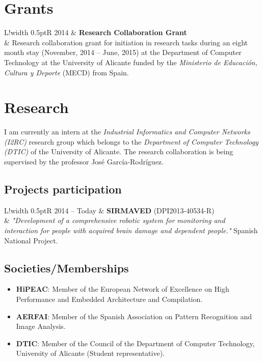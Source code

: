 \documentclass[8pt]{article}
\newcommand\VRule{\color{lightgray}\vrule width 0.5pt}
\begin{document}
\section*{Grants}
\begin{tabular}{L!{\VRule}R}
2014 & \textbf{Research Collaboration Grant}\\
& Research collaboration grant for initiation in research tasks during an eight month stay (November, 2014 -- June, 2015) at the Department of Computer Technology at the University of Alicante funded by the \textit{Ministerio de Educación, Cultura y Deporte} (MECD) from Spain.
\end{tabular}

\section*{Research}

I am currently an intern at the \textit{Industrial Informatics and Computer Networks (I2RC)} research group which belongs to the \textit{Department of Computer Technology (DTIC)} of the University of Alicante. The research collaboration is being supervised by the professor José García-Rodríguez.

\subsection*{Projects participation}

\begin{tabular}{L!{\VRule}R}
	2014 -- Today & \textbf{SIRMAVED} (DPI2013-40534-R)\\
	& \textit{"Development of a comprehensive robotic system for monitoring and interaction for people with acquired brain damage and dependent people."} Spanish National Project. \\
\end{tabular}

\subsection*{Societies/Memberships}

\begin{itemize}
	\item \textbf{HiPEAC}: Member of the European Network of Excellence on High Performance and Embedded Architecture and Compilation.
	\item \textbf{AERFAI}: Member of the Spanish Association on Pattern Recognition and Image Analysis.
	\item \textbf{DTIC}: Member of the Council of the Department of Computer Technology, University of Alicante (Student representative).
\end{itemize}
\end{document}
